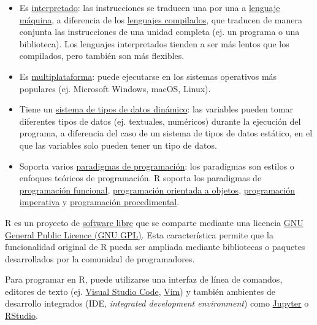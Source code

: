 \documentclass[
  letterpaper,
  DIV=11,
  numbers=noendperiod]{scrreprt}
\providecommand{\tightlist}{%
  \setlength{\itemsep}{0pt}\setlength{\parskip}{0pt}}\usepackage{longtable,booktabs,array}
\begin{document}
\begin{itemize}
\tightlist
\item
  Es
  \href{https://en.wikipedia.org/wiki/Interpreter_(computing)}{interpretado}:
  las instrucciones se traducen una por una a
  \href{https://en.wikipedia.org/wiki/Machine_code}{lenguaje máquina}, a
  diferencia de los
  \href{https://en.wikipedia.org/wiki/Compiler}{lenguajes compilados},
  que traducen de manera conjunta las instrucciones de una unidad
  completa (ej. un programa o una biblioteca). Los lenguajes
  interpretados tienden a ser más lentos que los compilados, pero
  también son más flexibles.
\item
  Es
  \href{https://en.wikipedia.org/wiki/Cross-platform_software}{multiplataforma}:
  puede ejecutarse en los sistemas operativos más populares (ej.
  Microsoft Windows, macOS, Linux).
\item
  Tiene un
  \href{https://pythonconquerstheuniverse.wordpress.com/2009/10/03/static-vs-dynamic-typing-of-programming-languages/}{sistema
  de tipos de datos dinámico}: las variables pueden tomar diferentes
  tipos de datos (ej. textuales, numéricos) durante la ejecución del
  programa, a diferencia del caso de un sistema de tipos de datos
  estático, en el que las variables solo pueden tener un tipo de datos.
\item
  Soporta varios
  \href{https://en.wikipedia.org/wiki/Programming_paradigm}{paradigmas
  de programación}: los paradigmas son estilos o enfoques teóricos de
  programación. R soporta los paradigmas de
  \href{https://en.wikipedia.org/wiki/Functional_programming}{programación
  funcional},
  \href{https://en.wikipedia.org/wiki/Object-oriented_programming}{programación
  orientada a objetos},
  \href{https://en.wikipedia.org/wiki/Imperative_programming}{programación
  imperativa} y
  \href{https://en.wikipedia.org/wiki/Procedural_programming}{programación
  procedimental}.
\end{itemize}

R es un proyecto de
\href{https://en.wikipedia.org/wiki/Free_software}{software libre} que
se comparte mediante una licencia
\href{https://www.gnu.org/licenses/old-licenses/gpl-2.0.html}{GNU
General Public Licence (GNU GPL)}. Esta característica permite que la
funcionalidad original de R pueda ser ampliada mediante bibliotecas o
paquetes desarrollados por la comunidad de programadores.

Para programar en R, puede utilizarse una interfaz de línea de comandos,
editores de texto (ej. \href{https://code.visualstudio.com/}{Visual
Studio Code}, \href{https://www.vim.org/}{Vim}) y también ambientes de
desarrollo integrados (IDE, \emph{integrated development environment})
como \href{https://jupyter.org/}{Jupyter} o
\href{https://rstudio.com/}{RStudio}.
\end{document}
